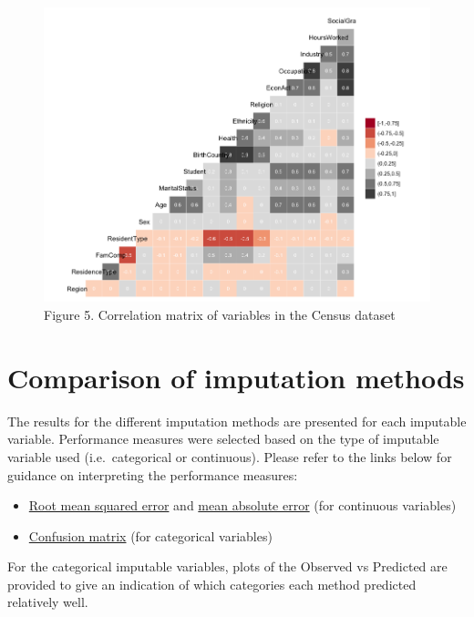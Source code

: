\documentclass[]{book}
\providecommand{\tightlist}{%
  \setlength{\itemsep}{0pt}\setlength{\parskip}{0pt}}
\begin{document}
\begin{figure}
\centering
\includegraphics{images/corr_all.png}
\caption{Figure 5. Correlation matrix of variables in the Census
dataset}
\end{figure}

\section{Comparison of imputation
methods}\label{comparison-of-imputation-methods}

The results for the different imputation methods are presented for each
imputable variable. Performance measures were selected based on the type
of imputable variable used (i.e.~categorical or continuous). Please
refer to the links below for guidance on interpreting the performance
measures:

\begin{itemize}
\tightlist
\item
  \href{https://medium.com/human-in-a-machine-world/mae-and-rmse-which-metric-is-better-e60ac3bde13d}{Root
  mean squared error} and
  \href{https://medium.com/human-in-a-machine-world/mae-and-rmse-which-metric-is-better-e60ac3bde13d}{mean
  absolute error} (for continuous variables)\\
\item
  \href{https://www.dataschool.io/simple-guide-to-confusion-matrix-terminology/}{Confusion
  matrix} (for categorical variables)
\end{itemize}

For the categorical imputable variables, plots of the Observed vs
Predicted are provided to give an indication of which categories each
method predicted relatively well.
\end{document}
